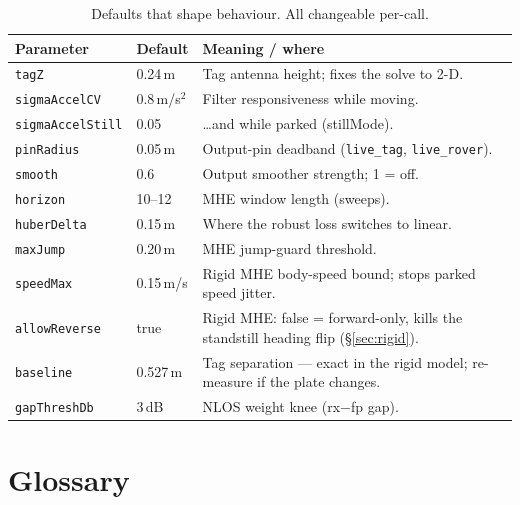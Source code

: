\documentclass[11pt,a4paper]{article}
\newcommand{\code}[1]{\texttt{#1}}
\begin{document}
\begin{table}[h]
\centering\small
\caption{Defaults that shape behaviour. All changeable per-call.}
\begin{tabular}{@{}llp{6.6cm}@{}}
\toprule
\textbf{Parameter} & \textbf{Default} & \textbf{Meaning / where}\\
\midrule
\code{tagZ} & 0.24\,m & Tag antenna height; fixes the solve to 2-D.\\
\code{sigmaAccelCV} & 0.8\,m/s$^2$ & Filter responsiveness while moving.\\
\code{sigmaAccelStill} & 0.05 & \ldots and while parked (stillMode).\\
\code{pinRadius} & 0.05\,m & Output-pin deadband (\code{live\_tag}, \code{live\_rover}).\\
\code{smooth} & 0.6 & Output smoother strength; 1 = off.\\
\code{horizon} & 10--12 & MHE window length (sweeps).\\
\code{huberDelta} & 0.15\,m & Where the robust loss switches to linear.\\
\code{maxJump} & 0.20\,m & MHE jump-guard threshold.\\
\code{speedMax} & 0.15\,m/s & Rigid MHE body-speed bound; stops parked speed jitter.\\
\code{allowReverse} & true & Rigid MHE: false = forward-only, kills the standstill
heading flip (\S\ref{sec:rigid}).\\
\code{baseline} & 0.527\,m & Tag separation --- exact in the rigid model; re-measure
if the plate changes.\\
\code{gapThreshDb} & 3\,dB & NLOS weight knee (rx$-$fp gap).\\
\bottomrule
\end{tabular}
\end{table}

\section{Glossary}
\label{app:glossary}
\end{document}
